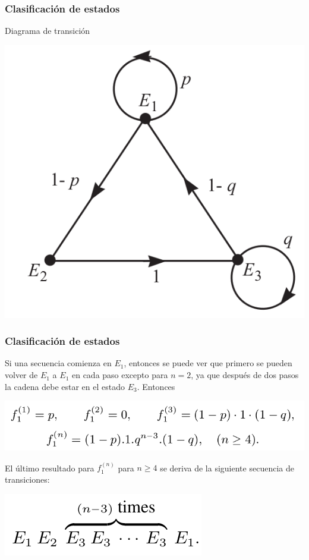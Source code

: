 \documentclass[spanish]{beamer}
\begin{document}
\begin{frame}
\frametitle{Clasificación de estados}
Diagrama de transición

\begin{center}
\includegraphics[scale=0.35]{im38}
\end{center}
\end{frame}

\begin{frame}
\frametitle{Clasificación de estados}
Si una secuencia comienza en $E_1$, entonces se puede ver que primero se pueden volver de $E_1$ a $E_1$ en cada paso excepto para $n = 2$, ya que después de dos pasos la cadena debe estar en el estado $E_3$. Entonces
\begin{center}
\includegraphics[scale=0.35]{im39}
\end{center}
El último resultado para $f_ {1} ^ {(n)}$ para $n \geq 4$ se deriva de la siguiente secuencia de transiciones:

\begin{center}
\includegraphics[scale=0.35]{im40}
\end{center}
\end{frame}
\end{document}
